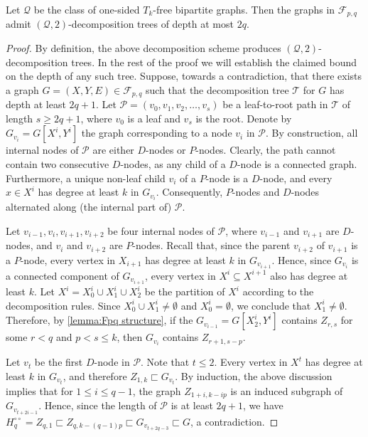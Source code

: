 \documentclass{theoretics}
\newcommand{\cF}{\ensuremath{\mathcal{F}}}
\newcommand{\cP}{\ensuremath{\mathcal{P}}}
\newcommand{\cQ}{\ensuremath{\mathcal{Q}}}
\newcommand{\cT}{\ensuremath{\mathcal{T}}}
\begin{document}
\begin{proposition}\label{prop:Fpp-decomposition}
	Let $\cQ$ be the class of one-sided $T_k$-free bipartite graphs.
	Then the graphs in $\cF_{p,q}$ admit $(\cQ,2)$-decomposition trees of depth at most $2q$.
\end{proposition}
\begin{proof}
	By definition, the above decomposition scheme produces $(\cQ,2)$-decomposition trees. 
	In the rest of the proof we will establish the claimed bound on the depth of any such tree.
	Suppose, towards a contradiction, that there exists a graph $G=(X,Y,E) \in \cF_{p,q}$
	such that the decomposition tree $\cT$ for $G$ has depth at least $2q+1$.
	Let $\cP = (v_0,v_1, v_2, \ldots, v_s)$ be a leaf-to-root path in $\cT$ of length $s \geq 2q+1$, where
	$v_0$ is a leaf and $v_s$ is the root. Denote by $G_{v_i} = G[X^{i}, Y^{i}]$ the graph
	corresponding to a node $v_i$ in $\cP$.
	By construction, all internal nodes of $\cP$ are either $D$-nodes or $P$-nodes.
	Clearly, the path cannot contain two consecutive $D$-nodes, as any child of a $D$-node
	is a connected graph.
	Furthermore, a unique non-leaf child $v_i$ of a $P$-node is a $D$-node, 
	and every $x \in X^{i}$ has degree at least $k$ in $G_{v_i}$. 
	Consequently, $P$-nodes and $D$-nodes alternated along (the internal part of) $\cP$. 
	
	Let $v_{i-1}, v_i, v_{i+1}, v_{i+2}$ be four internal nodes of $\cP$,
	where $v_{i-1}$ and $v_{i+1}$ are $D$-nodes, and $v_i$ and $v_{i+2}$ are $P$-nodes.
	Recall that, since the parent $v_{i+2}$ of $v_{i+1}$ is a $P$-node, every vertex in $X_{i+1}$ has degree at least $k$ in $G_{v_{i+1}}$.
	Hence, since $G_{v_i}$ is a connected component of $G_{v_{i+1}}$, every vertex in $X^{i} \subseteq X^{i+1}$ also has degree at least $k$.
	Let $X^{i} = X^{i}_0 \cup X^{i}_1 \cup X^{i}_2$ be the partition of $X^{i}$ according to the decomposition rules. Since $X^{i}_0 \cup X^{i}_1 \neq \emptyset$ and $X^i_0 = \emptyset$, we conclude that $X^{i}_1 \neq \emptyset$. Therefore, by \cref{lemma:Fpq structure}, if the $G_{v_{i-1}} = G[X^{i}_2, Y^i]$ contains $Z_{r,s}$ for some $r < q$ and $p < s \leq k$, then $G_{v_i}$ contains $Z_{r+1, s-p}$.
	
	Let $v_t$ be the first $D$-node in $\cP$. Note that $t \leq 2$. Every vertex in $X^t$ has degree at least $k$
	in $G_{v_t}$, and therefore $Z_{1,k} \sqsubset G_{v_t}$. By induction, the above discussion implies that
	for $1 \leq i \leq q-1$, the graph $Z_{1+i,k-ip}$ is an induced subgraph of $G_{v_{t+2i-1}}$.
	Hence, since the length of $\cP$ is at least $2q+1$, we have $H^{\circ\circ}_q = Z_{q,1} \sqsubset Z_{q,k-(q-1)p} \sqsubset G_{v_{t+2q-3}} \sqsubset G$, a contradiction.
\end{proof}
\end{document}
